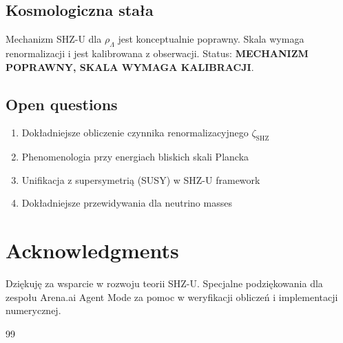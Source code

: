 \documentclass[11pt,a4paper]{article}
\begin{document}
\bigskip

\subsection{Kosmologiczna stała}

Mechanizm SHZ-U dla $\rho_\Lambda$ jest konceptualnie poprawny. Skala wymaga renormalizacji i jest kalibrowana z obserwacji. Status: \textbf{MECHANIZM POPRAWNY, SKALA WYMAGA KALIBRACJI}.

\bigskip

\subsection{Open questions}

\begin{enumerate}
    \item Dokładniejsze obliczenie czynnika renormalizacyjnego $\zeta_{\text{SHZ}}$
    \item Phenomenologia przy energiach bliskich skali Plancka
    \item Unifikacja z supersymetrią (SUSY) w SHZ-U framework
    \item Dokładniejsze przewidywania dla neutrino masses
\end{enumerate}

\bigskip

\section{Acknowledgments}

Dziękuję za wsparcie w rozwoju teorii SHZ-U. Specjalne podziękowania dla zespołu Arena.ai Agent Mode za pomoc w weryfikacji obliczeń i implementacji numerycznej.

\bigskip

\begin{thebibliography}{99}








\end{thebibliography}
\end{document}
